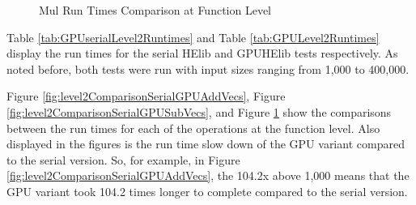 \begin{figure}[p]
\centering
{}

\caption{Mul Run Times Comparison at Function Level}
\label{fig:level2ComparisonSerialGPUMulVecs}
\end{figure}

Table \ref{tab:GPUserialLevel2Runtimes} and Table \ref{tab:GPULevel2Runtimes} display the run times for the serial HElib and GPUHElib tests respectively. As noted before, both tests were run with input sizes ranging from 1,000 to 400,000.

Figure \ref{fig:level2ComparisonSerialGPUAddVecs}, Figure \ref{fig:level2ComparisonSerialGPUSubVecs}, and Figure \ref{fig:level2ComparisonSerialGPUMulVecs} show the comparisons between the run times for each of the operations at the function level. Also displayed in the figures is the run time slow down of the GPU variant compared to the serial version. So, for example, in Figure \ref{fig:level2ComparisonSerialGPUAddVecs}, the 104.2x above 1,000 means that the GPU variant took 104.2 times longer to complete compared to the serial version.

